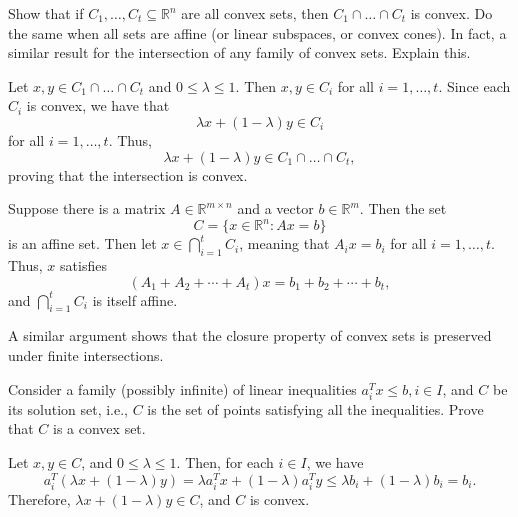 \begin{exercise}
  Show that if $C_1, \dots, C_t \subseteq \mathbb{R}^n$ are all convex sets, then $C_1 \cap \dots \cap C_t$ is convex.
  Do the same when all sets are affine (or linear subspaces, or convex cones).
  In fact, a similar result for the intersection of any family of convex sets.
  Explain this.
\end{exercise}

\begin{solution}
  Let $x, y \in C_1 \cap \dots \cap C_t$ and $0 \leq \lambda \leq 1$. Then $x, y \in C_i$ for all $i = 1, \dots, t$. Since each $C_i$ is convex, we have that
  \begin{equation}
    \lambda x + (1 - \lambda) y \in C_i
  \end{equation}
  for all $i = 1, \dots, t$. Thus,
  \begin{equation}
    \lambda x + (1 - \lambda) y \in C_1 \cap \dots \cap C_t,
  \end{equation}
  proving that the intersection is convex.

  Suppose there is a matrix $A \in \mathbb{R}^{m \times n}$ and a vector $b \in \mathbb{R}^m$.
  Then the set
  \begin{equation}
    C = \{ x \in \mathbb{R}^n : Ax = b \}
  \end{equation}
  is an affine set.
  Then let $x \in \bigcap_{i = 1}^t C_i$, meaning that $A_i x = b_i$ for all $i = 1, \dots, t$.
  Thus, $x$ satisfies
  \begin{equation}
    (A_1 + A_2 + \cdots + A_t) x = b_1 + b_2 + \cdots + b_t,
  \end{equation}
  and $\bigcap_{i = 1}^t C_i$ is itself affine.

  A similar argument shows that the closure property of convex sets is preserved under finite intersections.
\end{solution}

\begin{exercise}
  Consider a family (possibly infinite) of linear inequalities $a_i^T x \leq b, i \in I$, and $C$ be its solution set, i.e., $C$ is the set of points satisfying all the inequalities.
  Prove that $C$ is a convex set.
\end{exercise}

\begin{solution}
  Let $x, y \in C$, and $0 \leq \lambda \leq 1$.
  Then, for each $i \in I$, we have
  \begin{equation}
    a_i^T (\lambda x + (1 - \lambda) y) = \lambda a_i^T x + (1 - \lambda) a_i^T y \leq \lambda b_i + (1 - \lambda) b_i = b_i.
  \end{equation}
  Therefore, $\lambda x + (1 - \lambda) y \in C$, and $C$ is convex.
\end{solution}

